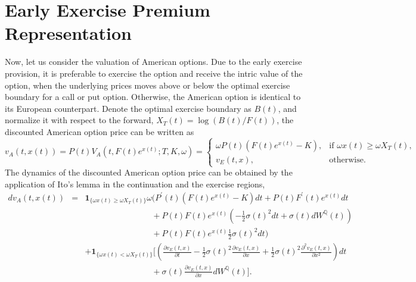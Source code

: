 \documentclass[12pt]{article}
\begin{document}
  \section{Early Exercise Premium Representation}

    Now, let us consider the valuation of American options. Due to the early exercise provision, it is preferable
    to exercise the option and receive the intric value of the option, when the underlying prices moves above or
    below the optimal exercise boundary for a call or put option. Otherwise, the American option is identical to
    its European counterpart. Denote the optimal exercise boundary as $B(t)$, and normalize it with respect to
    the forward, $X_T(t)=\log(B(t)/F(t))$, the discounted American option price can be written as
    \begin{equation}
      v_A(t,x(t))=P(t)V_A(t,F(t)e^{x(t)};T,K,\omega)
              =\begin{cases}
                 \omega P(t)\left(F(t)e^{x(t)}-K\right), & \mbox{if } \omega x(t) \geq \omega X_T(t),\\
                 v_E(t,x), & \mbox{otherwise}.
               \end{cases}
    \end{equation}
    The dynamics of the discounted American option price can be obtained by the application of Ito's lemma in the
    continuation and the exercise regions,
    \begin{eqnarray}
      dv_A(t,x(t))&=&\mathbf{1}_{\{\omega x(t) \geq \omega X_T(t)\}}\omega\bigg(P^{\prime}(t)\left(F(t)e^{x(t)}-K\right)dt
                                                                     +P(t)F^{\prime}(t)e^{x(t)}dt\nonumber\\
               &&\quad\quad\quad\quad\quad\quad\quad\quad +P(t)F(t)e^{x(t)}\left(-\frac{1}{2}\sigma(t)^2dt
                                                          + \sigma(t)dW^{\mathbb{Q}}(t)\right)\nonumber\\
               &&\quad\quad\quad\quad\quad\quad\quad\quad +P(t)F(t)e^{x(t)}\frac{1}{2}\sigma(t)^2dt\bigg)\nonumber\\
               && + \mathbf{1}_{\{\omega x(t)<\omega X_T(t)\}}\bigg[\left(\frac{\partial v_E(t,x)}{\partial t}
                        -\frac{1}{2}\sigma(t)^2\frac{\partial v_E(t,x)}{\partial x}
                    +\frac{1}{2}\sigma(t)^2\frac{\partial^2 v_E(t,x)}{\partial x^2}\right)dt\nonumber\\
               &&\quad\quad\quad\quad\quad\quad\quad\quad +\sigma(t)\frac{\partial v_E(t,x)}{\partial x}dW^{\mathbb{Q}}(t)\bigg].
    \end{eqnarray}
\end{document}
